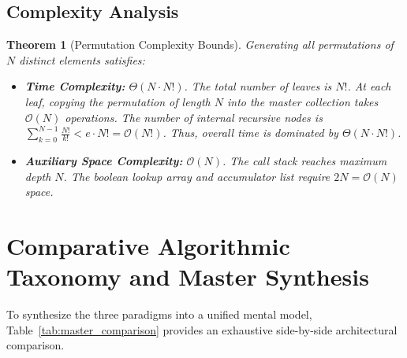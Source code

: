 \documentclass[10pt,journal,compsoc,onecolumn]{IEEEtran}
\newtheorem{theorem}{Theorem}
\begin{document}
\subsection{Complexity Analysis}
\begin{theorem}[Permutation Complexity Bounds]
Generating all permutations of $N$ distinct elements satisfies:
\begin{itemize}
    \item \textbf{Time Complexity:} $\Theta(N \cdot N!)$. The total number of leaves is $N!$. At each leaf, copying the permutation of length $N$ into the master collection takes $\mathcal{O}(N)$ operations. The number of internal recursive nodes is $\sum_{k=0}^{N-1} \frac{N!}{k!} < e \cdot N! = \mathcal{O}(N!)$. Thus, overall time is dominated by $\Theta(N \cdot N!)$.
    \item \textbf{Auxiliary Space Complexity:} $\mathcal{O}(N)$. The call stack reaches maximum depth $N$. The boolean lookup array and accumulator list require $2N = \mathcal{O}(N)$ space.
\end{itemize}
\end{theorem}

\section{Comparative Algorithmic Taxonomy and Master Synthesis}
\label{sec:synthesis}

To synthesize the three paradigms into a unified mental model, Table~\ref{tab:master_comparison} provides an exhaustive side-by-side architectural comparison.
\end{document}
